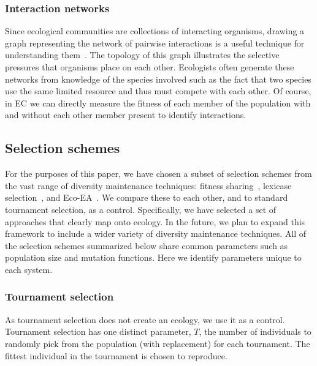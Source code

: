 \subsubsection{Interaction networks}
Since ecological communities are collections of interacting organisms, drawing a graph representing the network of pairwise interactions is a useful technique for understanding them~\cite{fontaine_ecological_2011}. The topology of this graph illustrates the selective pressures that organisms place on each other. Ecologists often generate these networks from knowledge of the species involved such as the fact that two species use the same limited resource and thus must compete with each other. 
Of course, in EC we can directly measure the fitness of each member of the population with and without each other member present to identify interactions.

\subsection{Selection schemes}

For the purposes of this paper, we have chosen a subset of selection schemes from the vast range of diversity maintenance techniques: fitness sharing~\cite{goldberg_genetic_1987}, lexicase selection~\cite{spector_assessment_2012}, and Eco-EA~\cite{goings_ecological_2009}. We compare these to each other, and to standard tournament selection, as a control. Specifically, we have selected a set of approaches that clearly map onto ecology. In the future, we plan to expand this framework to include a wider variety of diversity maintenance techniques. All of the selection schemes summarized below share common parameters such as population size and mutation functions.  Here we identify parameters unique to each system.

\subsubsection{Tournament selection}
As tournament selection does not create an ecology, we use it
as a control. Tournament selection has one distinct parameter, $T$, the number of individuals to randomly pick from the population (with replacement) for each tournament.  The fittest individual in the tournament is chosen to reproduce.

